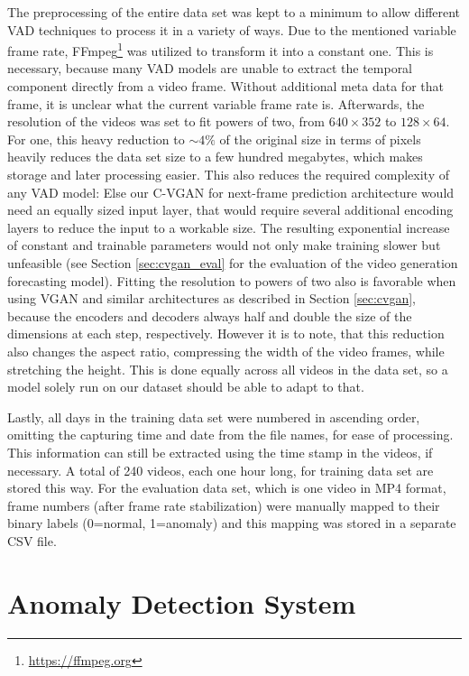 The preprocessing of the entire data set was kept to a minimum to allow different VAD techniques to process it in a variety of ways. Due to the mentioned variable frame rate, FFmpeg\footnote{\url{https://ffmpeg.org}} was utilized to transform it into a constant one. This is necessary, because many VAD models are unable to extract the temporal component directly from a video frame. Without additional meta data for that frame, it is unclear what the current variable frame rate is. Afterwards, the resolution of the videos was set to fit powers of two, from $640 \times 352$ to $128 \times 64$. For one, this heavy reduction to $\sim 4\%$ of the original size in terms of pixels heavily reduces the data set size to a few hundred megabytes, which makes storage and later processing easier. This also reduces the required complexity of any VAD model: Else our C-VGAN for next-frame prediction architecture would need an equally sized input layer, that would require several additional encoding layers to reduce the input to a workable size. The resulting exponential increase of constant and trainable parameters would not only make training slower but unfeasible (see Section \ref{sec:cvgan_eval} for the evaluation of the video generation forecasting model). Fitting the resolution to powers of two also is favorable when using VGAN and similar architectures as described in Section \ref{sec:cvgan}, because the encoders and decoders always half and double the size of the dimensions at each step, respectively. However it is to note, that this reduction also changes the aspect ratio, compressing the width of the video frames, while stretching the height. This is done equally across all videos in the data set, so a model solely run on our dataset should be able to adapt to that. 

Lastly, all days in the training data set were numbered in ascending order, omitting the capturing time and date from the file names, for ease of processing. This information can still be extracted using the time stamp in the videos, if necessary. A total of 240 videos, each one hour long, for training data set are stored this way. For the evaluation data set, which is one video in MP4 format, frame numbers (after frame rate stabilization) were manually mapped to their binary labels (0=normal, 1=anomaly) and this mapping was stored in a separate CSV file.



\section{Anomaly Detection System} \label{sec:framework}

